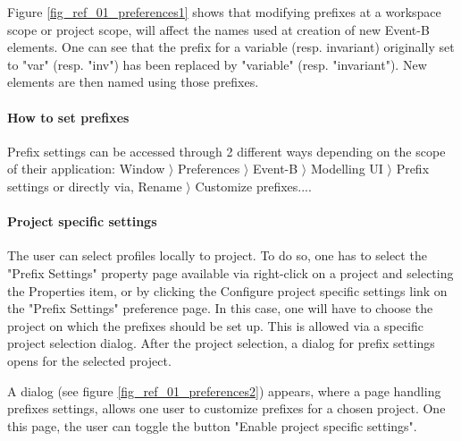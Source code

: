 
Figure \ref{fig_ref_01_preferences1} shows that modifying prefixes at a workspace scope or project scope, will affect the names used at creation of new Event-B elements. One can see that the prefix for a variable (resp. invariant) originally set to "var" (resp. "inv") has been replaced by "variable" (resp. "invariant"). New elements are then named using those prefixes.



\paragraph{How to set prefixes}

Prefix settings can be accessed through 2 different ways depending on the scope of their application: \textsf{Window $\rangle$ Preferences $\rangle$ Event-B $\rangle$ Modelling UI $\rangle$ Prefix settings} or directly via, \textsf{Rename $\rangle$ Customize prefixes...}.

\paragraph{Project specific settings}

The user can select profiles locally to project. To do so, one has to select the "Prefix Settings" property page available via right-click on a project and selecting the Properties item, or by clicking the Configure project specific settings link on the "Prefix Settings" preference page. In this case, one will have to choose the project on which the prefixes should be set up. This is allowed via a specific project selection dialog. After the project selection, a dialog for prefix settings opens for the selected project. 

A dialog (see figure \ref{fig_ref_01_preferences2}) appears, where a page handling prefixes settings, allows one user to customize prefixes for a chosen project. One this page, the user can toggle the button "Enable project specific settings".

